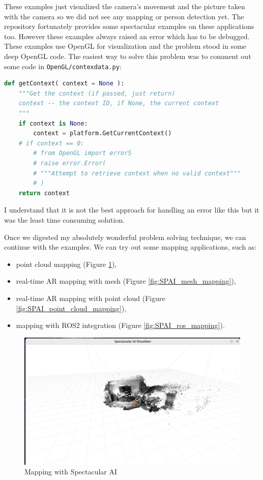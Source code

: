 These examples just visualized the camera's movement and the picture taken with the camera so we did not see any mapping or person detection yet. The repository fortunately provides some spectacular examples on these applications too. However these examples always raised an error which has to be debugged. These examples use OpenGL for visualization and the problem stood in some deep OpenGL code. The easiest way to solve this problem was to comment out some code in \verb|OpenGL/contexdata.py|:

\begin{lstlisting}[language=python,frame=single,float=!ht]
def getContext( context = None ):
    """Get the context (if passed, just return)
    context -- the context ID, if None, the current context
    """
    if context is None:
        context = platform.GetCurrentContext()
    # if context == 0:
        # from OpenGL import errorS
        # raise error.Error(
        # """Attempt to retrieve context when no valid context"""
        # )
    return context
\end{lstlisting}

I understand that it is not the best approach for handling an error like this but it was the least time consuming solution.

Once we digested my absolutely wonderful problem solving technique, we can continue with the examples. We can try out some mapping applications, such as:
\begin{itemize}
    \item point cloud mapping (Figure \ref{fig:SPAI_mapping}),
    \item real-time AR mapping with mesh (Figure \ref{fig:SPAI_mesh_mapping}),
    \item real-time AR mapping with point cloud (Figure \ref{fig:SPAI_point_cloud_mapping}),
    \item mapping with ROS2 integration (Figure \ref{fig:SPAI_ros_mapping}).
\end{itemize}

\begin{figure}[H]
	\centering
	\includegraphics[width=150mm, keepaspectratio]{figures/spectacular_ai_mapping_visu.png}
	\caption{Mapping with Spectacular AI}
	\label{fig:SPAI_mapping}
\end{figure}

